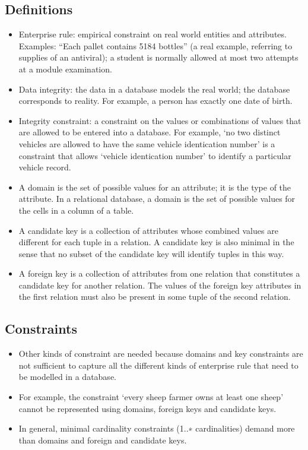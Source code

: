 \documentclass[10pt]{article}
\begin{document}
    \subsection*{Definitions}
      \begin{itemize}
        \item Enterprise rule:  empirical constraint on real world entities and attributes. Examples:  ``Each  pallet  contains  5184  bottles''  (a  real  example,  referring  to  supplies of an antiviral); a student is normally allowed at most two attempts at a module examination.
        \item Data  integrity:   the  data  in  a  database  models  the  real  world;  the  database corresponds to reality.  For example, a person has exactly one date of birth.  
        \item Integrity  constraint:  a  constraint  on  the  values  or  combinations  of  values  that are allowed to be entered into a database.  For example, `no two distinct vehicles are allowed to have the same vehicle identication number' is a constraint that allows `vehicle identication number' to identify a particular vehicle record.
        \item A domain is the set of possible values for an attribute; it is the type of the attribute. In a relational database, a domain is the set of possible values for the cells in a column of a table.
        \item A candidate key is a collection of attributes whose combined values are different for each tuple in a relation. A candidate key is also minimal in the sense that no subset of the candidate key will identify tuples in this way.
        \item A foreign key is a collection of attributes from one relation that constitutes a candidate key for another relation. The values of the foreign key attributes in the first relation must also be present in some tuple of the second relation.
      \end{itemize}

     \subsection*{Constraints}
       \begin{itemize}
         \item Other kinds of constraint are needed because domains and key constraints are not sufficient to capture all the different kinds of enterprise rule that need to be modelled in a database.
         \item For example, the constraint ‘every sheep farmer owns at least one sheep’ cannot be represented using domains, foreign keys and candidate keys.
         \item In general, minimal cardinality constraints (1..∗ cardinalities) demand more than domains and foreign and candidate keys.
       \end{itemize}
\end{document}
